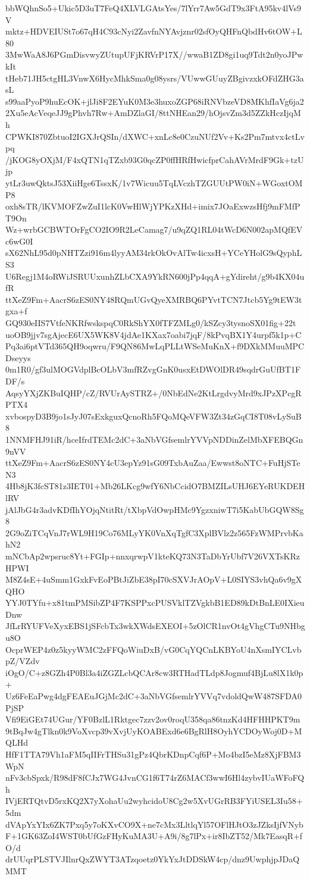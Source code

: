 bbWQhnSo5+Ukic5D3uT7FeQ4XLVLGAtsYes/7lYrr7Aw5GdT9x3FtA95kv4lVs9V
mktz+HDVEIUSt7o67qH4C93cNyi2ZavfnNYAvjznr02sfOyQHFnQbdHv6tOW+L80
3MwWaA8J6PGmDisvwyZUtupUFjKRVrP17X//wwaB1ZD8gi1uq9Tdt2n0yoJPwkIt
tHeb71JH5ctgHL3VnwX6HycMhkSma0g08ysrs/VUwwGUuyZBgivzxkOFdZHG3asL
s99aaPyoP9huEcOK+jlJi8F2EYuK0M3e3huxoZGP68iRNVbzeVD8MKhfIaVg6ja2
2Xu5eAcVeqeJJ9gPhvh7Rw+AmDZlaGI/8ttNHEan29/hOjsvZm3d5ZZkHczIjqMh
CPWKI870ZbtuoI2IGXJrQSIn/dXWC+xnLc8e0CzuNUf2Vv+Ks2Pm7mtvx4ctLvpq
/jKOG8yOXjM/F4xQTN1qTZxb93G0qcZP0ffHRfHwicfprCahAVrMrdF9Gk+tzUjp
ytLr3uwQktsJ53XiiHge6TssxK/1v7Wicuu5TqLVczhTZGUUtPW0iN+WGoxtOMP8
oxh8sTR/lKVMOFZwZuI1lcK0VwHlWjYPKzXHd+imix7JOaExwzsHfj9mFMfPT9On
Wz+wrbGCBWTOrFgCO2IO9R2LeCamag7/u9qZQ1RL04tWcD6N002apMQfEVc6wG0I
sX62NhL95d0pNHTZzi916m4lyyAM34rkOkOvAlTw4icxsH+YCeYHolG9sQyphLS3
U6Regj1M4oRWiJSRUUxunhZLbCXA9YkRN600jPp4qqA+gYdireht/g9b4KX04ufR
ttXeZ9Fm+AacrS6zES0NY48RQmUGvQyeXMRBQ6PYvtTCN7Jtcb5Yg9tEW3tgxa+f
GQ930eIIS7VtfeNKRfwskspqC0RkShYX0fTFZMLg0/kSZcy3tysnoSX01fig+22t
uoOB9jjv7sgAjecE6UX5WK8V4jdAe1KXax7oabi7jqF/8kPvqBX1Y4urpf5k1p+C
Pq3ai6ptVTd365QH9oqwru/F9QN86MwLqPLLtWSeMuKnX+f9DXkMMuuMPCDseyys
0m1R0/gf3ulMOGVdplBcOLbV3mfRZvgGnK0usxEtDWOlDR49sqdrGuUfBT1FDF/s
AqsyYXjZKBuIQHP/cZ/RVUrAySTRZ+/0NbEdNe2KtLrgdvyMrd9xJPzXPcgRPTX4
xvbospyD3B9jo1sJyJ07sExkguxQcnoRh5FQoMQeVFW3Zt34zGqCI8T08vLySuB8
1NNMFHJ91iR/hceIfrdTEMc2dC+3aNbVGfsemlrYVVpNDDinZelMbXFEBQGn9nVV
ttXeZ9Fm+AacrS6zES0NY4cU3epYz91sG09TxbAuZaa/Ewwst8oNTC+FuHjSTeN3
4Hb8jK3fcST81z3IET01+Mb26LKcg9wfY6NbCcidO7BMZILsUHJ6EYeRUKDEHlRV
jAlJbG4r3advKDfIhYOjqNtitRt/tXbpVdOwpHMc9YgzxniwT7i5KabUbGQW8Sg8
2G9oZiTCqVnJ7rWL9H19Co76MLyYK0VnXqTgfC3XplBVlz2z565FzWMPrvbKahN2
mNCbAp2wpsruc8Yt+FGIp+nnxqrwpV1kteKQ73N3TaDbYrUbf7V26VXTsKRzHPWI
M8Z4sE+4uSmm1GxkFvEoPBtJiZbE38pI70cSXVJrAOpV+L0SIYS3vhQa6v9gXQHO
YYJ0TYfu+x81tmPMSibZP4F7KSPPxcPUSVklTZVgkbB1ED89kDtBnLE0IXieuDnw
JfLrRYUFVeXyxEBS1jSFcbTx3wkXWdsEXEOI+5zOlCR1nvOt4gVhgCTu9NHbgu8O
OcprWEP4z0z5kyyWMC2zFFQoWiuDxB/vG0CqYQCnLKBYoU4nXsmIYCLvbpZ/VZdv
iOgO/C+z8GZh4P0Bl3a4iZGZLcbQCAr8cw3RTHadTLdp8Jogmuf4BjLu8lX1k0p+
Uz6FeEaPwg4dgFEAEuJGjMc2dC+3aNbVGfsemlrYVVq7vdoldQwW487SFDA0PjSP
Vfi9EiGEt74UGur/YF0BzlL1Rktgec7zzv2ov0roqU358qa86tnzKd4HFHHPKT9m
9tBqJw4gTlkn0k9VoXvcp39vXvjUyKOABExd6e6BgRlH8OyhYCDOyWoj0D+MQLHd
HfF1TTA79Vh1aFM5qIIFrTHSu31gPz4QbrKDnpCqf6P+Mo4bzI5eMz8XjFBM3WpN
nFv3cbSpxk/R98dF8fCJx7WG4JvnCG1f6T74rZ6MACf3wwI6Hl4zybvIUaWFoFQh
IVjERTQtvD5rxKQ2X7yXohaUu2wyhcidoU8Cg2w5XvUGrRB3FYiUSEL3Iu58+5dm
dVApYxYIx6ZK7Pxq5y7oKXvCO9X+ne7cMx3LltlqYl57OFlHJtO3zJZksIjfVNyb
F+1GK63ZoI4WST0bUfGzFHyKuMA3U+A9i/8g7lPx+ir8IbZT52/Mk7EasqR+fO/d
drUUqrPLSTVJIlnrQxZWYT3ATzqoetz0YkYxJtDDSkW4cp/dnz9UwphjpJDaQMMT
